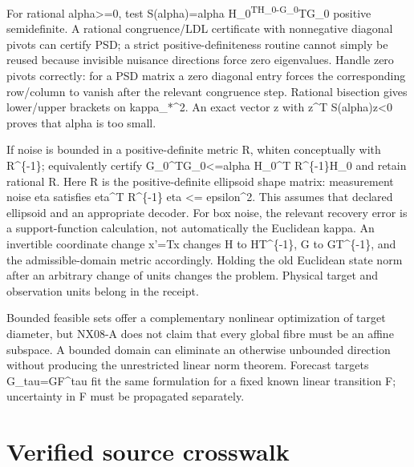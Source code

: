 \documentclass[
  11pt,
  a4paper,
]{report}
\begin{document}
For rational alpha\textgreater=0, test S(alpha)=alpha
H\_0\textsuperscript{TH\_0-G\_0}TG\_0 positive semidefinite. A rational
congruence/LDL certificate with nonnegative diagonal pivots can certify
PSD; a strict positive-definiteness routine cannot simply be reused
because invisible nuisance directions force zero eigenvalues. Handle
zero pivots correctly: for a PSD matrix a zero diagonal entry forces the
corresponding row/column to vanish after the relevant congruence step.
Rational bisection gives lower/upper brackets on kappa\_*\^{}2. An exact
vector z with z\^{}T S(alpha)z\textless0 proves that alpha is too small.

If noise is bounded in a positive-definite metric R, whiten conceptually
with R\^{}\{-1\}; equivalently certify G\_0\^{}TG\_0\textless=alpha
H\_0\^{}T R\^{}\{-1\}H\_0 and retain rational R. Here R is the
positive-definite ellipsoid shape matrix: measurement noise eta
satisfies eta\^{}T R\^{}\{-1\} eta \textless= epsilon\^{}2. This assumes
that declared ellipsoid and an appropriate decoder. For box noise, the
relevant recovery error is a support-function calculation, not
automatically the Euclidean kappa. An invertible coordinate change x'=Tx
changes H to HT\^{}\{-1\}, G to GT\^{}\{-1\}, and the admissible-domain
metric accordingly. Holding the old Euclidean state norm after an
arbitrary change of units changes the problem. Physical target and
observation units belong in the receipt.

Bounded feasible sets offer a complementary nonlinear optimization of
target diameter, but NX08-A does not claim that every global fibre must
be an affine subspace. A bounded domain can eliminate an otherwise
unbounded direction without producing the unrestricted linear norm
theorem. Forecast targets G\_tau=GF\^{}tau fit the same formulation for
a fixed known linear transition F; uncertainty in F must be propagated
separately.

\hypertarget{verified-source-crosswalk}{%
\section{Verified source crosswalk}\label{verified-source-crosswalk}}
\end{document}

